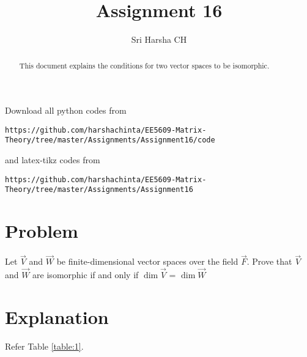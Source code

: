 \documentclass[journal,12pt,twocolumn]{IEEEtran}
\begin{document}
\renewcommand{\thefigure}{\theproblem}

\def\putbox#1#2#3{\makebox[0in][l]{\makebox[#1][l]{}\raisebox{\baselineskip}[0in][0in]{\raisebox{#2}[0in][0in]{#3}}}}
     \def\rightbox#1{\makebox[0in][r]{#1}}
     \def\centbox#1{\makebox[0in]{#1}}
     \def\topbox#1{\raisebox{-\baselineskip}[0in][0in]{#1}}
     \def\midbox#1{\raisebox{-0.5\baselineskip}[0in][0in]{#1}}
\vspace{3cm}
\title{Assignment 16}
\author{Sri Harsha CH}

\maketitle
\newpage

\bigskip
\renewcommand{\thefigure}{\theenumi}
\renewcommand{\thetable}{\theenumi}

\begin{abstract}
This document explains the conditions for two vector spaces to be isomorphic. 
\end{abstract}

Download all python codes from 
\begin{lstlisting}
https://github.com/harshachinta/EE5609-Matrix-Theory/tree/master/Assignments/Assignment16/code
\end{lstlisting}
%
and latex-tikz codes from 
%
\begin{lstlisting}
https://github.com/harshachinta/EE5609-Matrix-Theory/tree/master/Assignments/Assignment16
\end{lstlisting}
%
\section{Problem}
Let $\vec{V}$ and $\vec{W}$ be finite-dimensional vector spaces over the field $\vec{F}$. Prove that $\vec{V}$ and $\vec{W}$ are isomorphic if and only if $\dim{\vec{V}}$ = $\dim{\vec{W}}$
\section{Explanation}
Refer Table \ref{table:1}.
\end{document}
